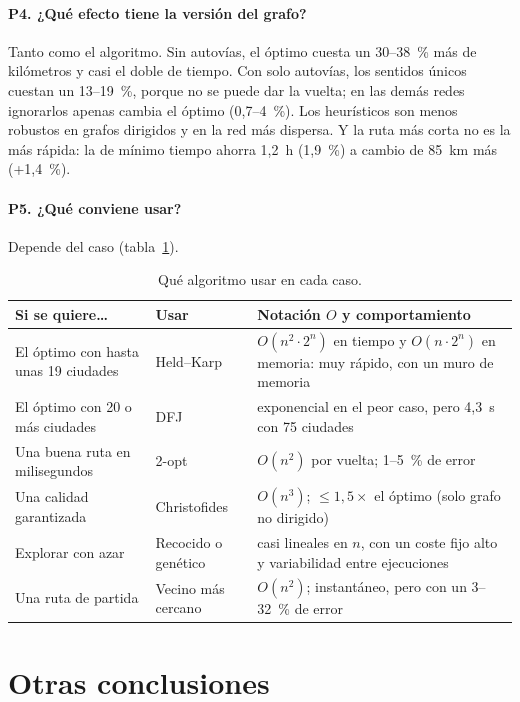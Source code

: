 \paragraph{P4. ¿Qué efecto tiene la versión del grafo?} Tanto como el algoritmo. Sin autovías, el óptimo cuesta un 30--38~\% más de kilómetros y casi el doble de tiempo. Con solo autovías, los sentidos únicos cuestan un 13--19~\%, porque no se puede dar la vuelta; en las demás redes ignorarlos apenas cambia el óptimo (0,7--4~\%).
Los heurísticos son menos robustos en grafos dirigidos y en la red más dispersa. Y la ruta más corta no es la más rápida: la de mínimo tiempo ahorra 1,2~h (1,9~\%) a cambio de 85~km más (+1,4~\%).

\paragraph{P5. ¿Qué conviene usar?} Depende del caso (tabla~\ref{tab:recomendaciones}).

\begin{table}[htbp]
  \centering
  \caption{Qué algoritmo usar en cada caso.}\label{tab:recomendaciones}
  \small
  \begin{tabularx}{\linewidth}{@{}X l X@{}}
    \toprule
    Si se quiere\dots & Usar & Notación $O$ y comportamiento \\
    \midrule
    El óptimo con hasta unas 19 ciudades & Held--Karp & $O(n^2\cdot 2^n)$ en tiempo y $O(n\cdot 2^n)$ en memoria: muy rápido, con un muro de memoria \\
    El óptimo con 20 o más ciudades & DFJ & exponencial en el peor caso, pero 4,3~s con 75 ciudades \\
    Una buena ruta en milisegundos & 2-opt & $O(n^2)$ por vuelta; 1--5~\% de error \\
    Una calidad garantizada & Christofides & $O(n^3)$; $\le 1{,}5\times$ el óptimo (solo grafo no dirigido) \\
    Explorar con azar & Recocido o genético & casi lineales en $n$, con un coste fijo alto y variabilidad entre ejecuciones \\
    Una ruta de partida & Vecino más cercano & $O(n^2)$; instantáneo, pero con un 3--32~\% de error \\
    \bottomrule
  \end{tabularx}
\end{table}

\section{Otras conclusiones}

